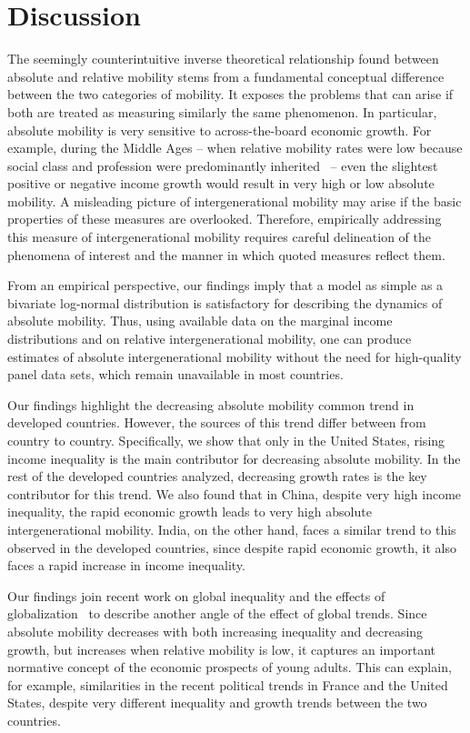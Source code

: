 \documentclass[12pt,a4paper]{article}
\numberwithin{equation}{section}
\begin{document}
\section{Discussion}

The seemingly counterintuitive inverse theoretical relationship found between absolute and relative mobility stems from a fundamental conceptual difference between the two categories of mobility. It exposes the problems that can arise if both are treated as measuring similarly the same phenomenon. In particular, absolute mobility is very sensitive to across-the-board economic growth. For example, during the Middle Ages -- when relative mobility rates were low because social class and profession were predominantly inherited~\citep{goldthorpe1982social,clark2014also} -- even the slightest positive or negative income growth would result in very high or low absolute mobility. A misleading picture of intergenerational mobility may arise if the basic properties of these measures are overlooked. Therefore, empirically addressing this measure of intergenerational mobility requires careful delineation of the phenomena of interest and the manner in which quoted measures reflect them.

From an empirical perspective, our findings imply that a model as simple as a bivariate log-normal distribution is satisfactory for describing the dynamics of absolute mobility. Thus, using available data on the marginal income distributions and on relative intergenerational mobility, one can produce estimates of absolute intergenerational mobility without the need for high-quality panel data sets, which remain unavailable in most countries.

Our findings highlight the decreasing absolute mobility common trend in developed countries. However, the sources of this trend differ between from country to country. Specifically, we show that only in the United States, rising income inequality is the main contributor for decreasing absolute mobility. In the rest of the developed countries analyzed, decreasing growth rates is the key contributor for this trend. We also found that in China, despite very high income inequality, the rapid economic growth leads to very high absolute intergenerational mobility. India, on the other hand, faces a similar trend to this observed in the developed countries, since despite rapid economic growth, it also faces a rapid increase in income inequality.

Our findings join recent work on global inequality and the effects of globalization~\citep{bourguignon2017globalization,milanovic2016global,rodrik2017populism,alvaredo2017global} to describe another angle of the effect of global trends. Since absolute mobility decreases with both increasing inequality and decreasing growth, but increases when relative mobility is low, it captures an important normative concept of the economic prospects of young adults. This can explain, for example, similarities in the recent political trends in France and the United States, despite very different inequality and growth trends between the two countries.
\end{document}
